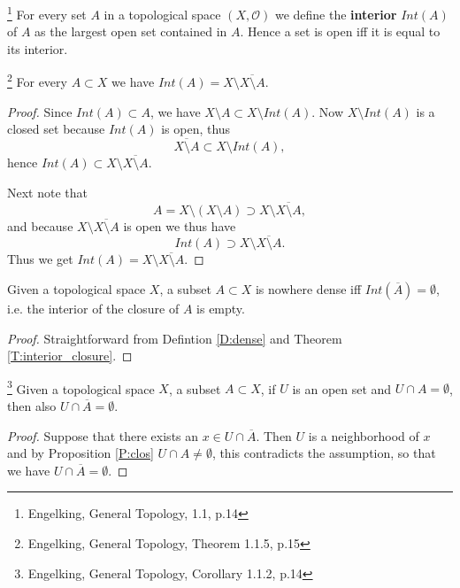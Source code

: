 \begin{definition}
\footnote{Engelking, General Topology, 1.1, p.14}
For every set $A$ in a topological space $(X,\mathcal{O})$ we define the 
\textbf{interior} 
$Int(A)$ of $A$ as the largest open set contained in $A$. 
Hence a set is open iff it is equal to its interior.
\end{definition}

\begin{theorem} \label{T:interior_closure}
\footnote{Engelking, General Topology, Theorem 1.1.5, p.15}
For every $A\subset X$ we have $Int(A)= X\setminus \overline{X\setminus A}$.
\end{theorem}
\begin{proof}
Since $Int(A)\subset A$, we have $X\setminus A\subset X\setminus Int(A)$. Now
$X\setminus Int(A)$ is a closed set because $Int(A)$ is open, thus
\[
	\overline{X\setminus A} \subset X\setminus Int(A),
\]
hence $Int(A)\subset X\setminus \overline{X\setminus A}$.

Next note that 
\[
	A=X\setminus (X\setminus A) \supset X\setminus \overline{X\setminus A},
\]
and because $X\setminus \overline{X\setminus A}$ is open we thus have
\[
	Int(A)\supset X\setminus \overline{X\setminus A}.
\]
Thus we get $Int(A)= X\setminus \overline{X\setminus A}$.
\end{proof}

\begin{proposition} \label{P:nodense}
Given a topological space $X$, a subset $A\subset X$ is nowhere dense iff
$Int(\overline{A})=\emptyset$, i.e. the interior of the closure of $A$ is 
empty. 
\end{proposition}
\begin{proof}
Straightforward from Defintion \ref{D:dense} and Theorem \ref{T:interior_closure}.
\end{proof}

\begin{corollary} \label{C:clos}
\footnote{Engelking, General Topology, Corollary 1.1.2, p.14}
Given a topological space $X$, a subset $A\subset X$, if $U$ is an open set and
$U\cap A=\emptyset$, then also $U\cap \overline{A}=\emptyset$.
\end{corollary}
\begin{proof}
Suppose that there exists an $x\in U\cap\overline{A}$. Then $U$ is a
neighborhood of $x$ and by Proposition \ref{P:clos} $U\cap A\neq \emptyset$,
this contradicts the assumption, so that we have $U\cap \overline{A}=\emptyset$.
\end{proof}

